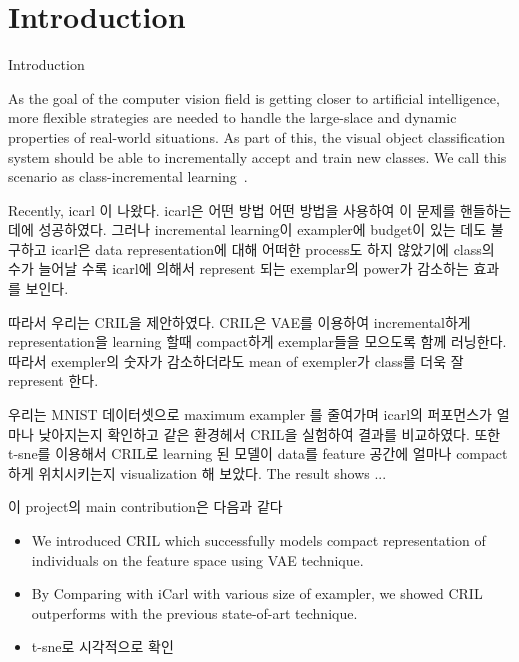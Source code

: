 \section{Introduction}
\label{sec:introduction}

Introduction

As the goal of the computer vision field is getting closer to artificial intelligence, more flexible strategies are needed to handle the large-slace and dynamic properties of real-world situations. As part of this, the visual object classification system should be able to incrementally accept and train new classes. We call this scenario as class-incremental learning~\cite{Rebuffi:2016aa}.

Recently, icarl 이 나왔다. icarl은 어떤 방법 어떤 방법을 사용하여 이 문제를 핸들하는데에 성공하였다. 그러나 incremental learning이 exampler에 budget이 있는 데도 불구하고 icarl은 data representation에 대해 어떠한 process도 하지 않았기에 class의 수가 늘어날 수록 icarl에 의해서 represent 되는 exemplar의 power가 감소하는 효과를 보인다.

따라서 우리는 CRIL을 제안하였다. CRIL은 VAE를 이용하여 incremental하게 representation을 learning 할때 compact하게 exemplar들을 모으도록 함께 러닝한다. 따라서 exempler의 숫자가 감소하더라도 mean of exempler가 class를 더욱 잘 represent 한다.

우리는 MNIST 데이터셋으로 maximum exampler  를 줄여가며 icarl의 퍼포먼스가 얼마나 낮아지는지 확인하고 같은 환경헤서 CRIL을 실험하여 결과를 비교하였다. 또한 t-sne를 이용해서 CRIL로 learning 된 모델이 data를 feature 공간에 얼마나 compact하게 위치시키는지 visualization 해 보았다. The result shows ...

이 project의 main contribution은 다음과 같다
\begin{itemize}
\item We introduced CRIL which successfully models compact representation of individuals on the feature space using VAE technique.
\item By Comparing with iCarl with various size of exampler, we showed CRIL outperforms with the previous state-of-art technique.
\item t-sne로 시각적으로 확인
\end{itemize}
